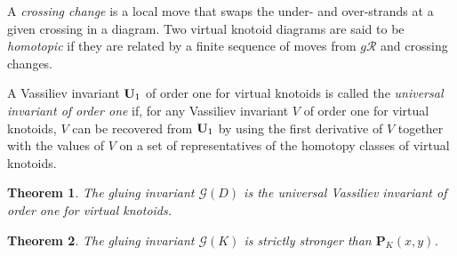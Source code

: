 \documentclass[12pt]{amsart}
\theoremstyle{noparens}
\newtheorem{theorem}{Theorem}[section]
\numberwithin{equation}{section}
\numberwithin{equation}{section}
\begin{document}
A \textit{crossing change} is a local move that swaps the under- and over-strands at a given crossing in a diagram.
Two virtual knotoid diagrams are said to be \textit{homotopic} if they are related by a finite sequence of moves from $\textit{g}\mathcal{R}$ and crossing changes.

A Vassiliev invariant $\bold{U}_1$ of order one for virtual knotoids is called the \textit{universal invariant of order one} if, for any Vassiliev invariant $V$ of order one for virtual knotoids, $V$ can be recovered from $\bold{U}_1$ by using the first derivative of $V$ together with the values of $V$ on a set of representatives of the homotopy classes of virtual knotoids. 

\begin{theorem} \cite[Th.~3.26]{Pet} \label{th4.2}
	The gluing invariant $\mathcal{G}(D)$ is the universal Vassiliev invariant of order one for virtual knotoids.
\end{theorem}


\begin{theorem} \label{prop4.1}
	The gluing invariant $\mathcal{G}(K)$ is strictly stronger than $\mathbf{P}_K(x,y)$.
\end{theorem}
\end{document}
